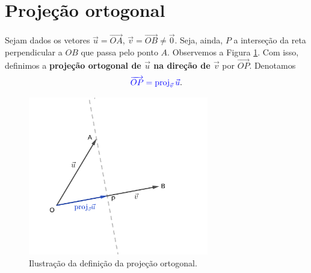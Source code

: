 \section{Projeção ortogonal}\label{cap_prodesc_sec_proj}

Sejam dados os vetores $\vec{u}=\overrightarrow{OA}$, $\vec{v}=\overrightarrow{OB}\neq\vec{0}$. Seja, ainda, $P$ a interseção da reta perpendicular a $OB$ que passa pelo ponto $A$. Observemos a Figura \ref{fig:proj}. Com isso, definimos a {\bf projeção ortogonal de $\vec{u}$ na direção de $\vec{v}$}  por $\overrightarrow{OP}$. Denotamos
\begin{equation}
  {\color{blue}\overrightarrow{OP} = \operatorname{proj}_{\vec{v}}\vec{u}}.
\end{equation}

\begin{figure}[H]
  \centering
  \includegraphics[width=0.7\textwidth]{./cap_prodesc/dados/fig_proj/fig_proj}
  \caption{Ilustração da definição da projeção ortogonal.}
  \label{fig:proj}
\end{figure}

